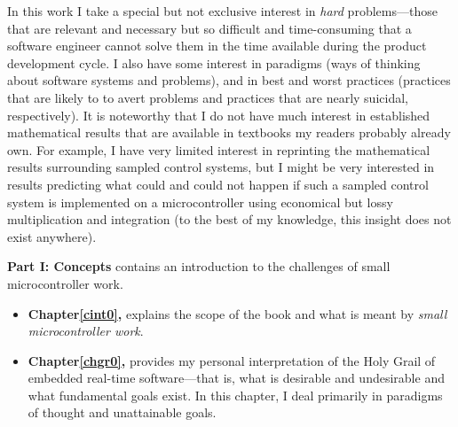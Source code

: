 In this work I take a special but not exclusive interest in
\emph{hard} problems---those that are relevant and necessary
but
so difficult and time-consuming that a software engineer cannot
solve them in the time available during the product development
cycle.  I also have some interest in paradigms (ways of
thinking about software systems and problems), and in
best and worst practices (practices that are likely to to
avert problems and practices that are nearly suicidal,
respectively).  It is noteworthy that I do not
have much interest in established
mathematical results that are available in
textbooks my readers probably already own.
For example, I have very limited interest in
reprinting the mathematical results surrounding
sampled control systems, but
I might be very interested in results predicting what
could and could not happen if such a
sampled control system is implemented on
a microcontroller using economical but lossy
multiplication and integration (to the best of my
knowledge, this insight does not exist anywhere).

\textbf{Part I:  Concepts}
contains an introduction to the challenges of small microcontroller work.
\begin{itemize}
\item \textbf{Chapter\;\ref{cint0}, \cintzerotitle{}} explains the scope of the book 
      and what is meant by \emph{small microcontroller work}.
\item \textbf{Chapter\;\ref{chgr0}, \chgrzerotitle{}} provides my personal 
      interpretation of the
      Holy Grail of embedded real-time software---that is, what is
      desirable and undesirable and what fundamental goals
      exist.  In this chapter, I deal primarily in paradigms of
      thought and
      unattainable goals.
\end{itemize}

